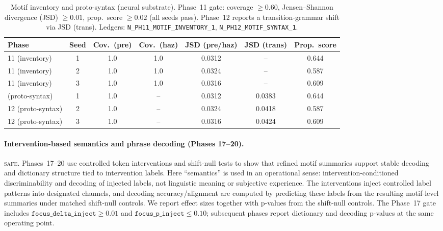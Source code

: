 \documentclass[11pt]{article}
\newcommand{\SAFE}{\textsc{safe}}
\begin{document}
\begin{table}[t]
\centering
\small
\begin{tabular}{@{}l c c c c c c@{}}
\toprule
Phase & Seed & Cov.\ (pre) & Cov.\ (haz) & JSD (pre/haz) & JSD (trans) & Prop.\ score \\
\midrule
11 (inventory) & 1 & 1.0 & 1.0 & 0.0312 & -- & 0.644 \\
11 (inventory) & 2 & 1.0 & 1.0 & 0.0324 & -- & 0.587 \\
11 (inventory) & 3 & 1.0 & 1.0 & 0.0316 & -- & 0.609 \\
\addlinespace
12 (proto-syntax) & 1 & 1.0 & -- & 0.0312 & 0.0383 & 0.644 \\
12 (proto-syntax) & 2 & 1.0 & -- & 0.0324 & 0.0418 & 0.587 \\
12 (proto-syntax) & 3 & 1.0 & -- & 0.0316 & 0.0424 & 0.609 \\
\bottomrule
\end{tabular}
\caption{Motif inventory and proto-syntax (neural substrate). Phase~11 gate: coverage $\ge 0.60$, Jensen--Shannon divergence (JSD) $\ge 0.01$, prop.\ score $\ge 0.02$ (all seeds pass). Phase~12 reports a transition-grammar shift via JSD (trans). Ledgers: \texttt{N\_PH11\_MOTIF\_INVENTORY\_1}, \texttt{N\_PH12\_MOTIF\_SYNTAX\_1}.}
\label{tab:motif_inventory}
\end{table}

\paragraph{Intervention-based semantics and phrase decoding (Phases 17--20).}
\SAFE. Phases~17--20 use controlled token interventions and shift-null tests to show that refined motif summaries support stable decoding and dictionary structure tied to intervention labels. Here ``semantics'' is used in an operational sense: intervention-conditioned discriminability and decoding of injected labels, not linguistic meaning or subjective experience. The interventions inject controlled label patterns into designated channels, and decoding accuracy/alignment are computed by predicting these labels from the resulting motif-level summaries under matched shift-null controls. We report effect sizes together with p-values from the shift-null controls. The Phase~17 gate includes $\texttt{focus\_delta\_inject}\ge 0.01$ and $\texttt{focus\_p\_inject}\le 0.10$; subsequent phases report dictionary and decoding p-values at the same operating point.
\end{document}
